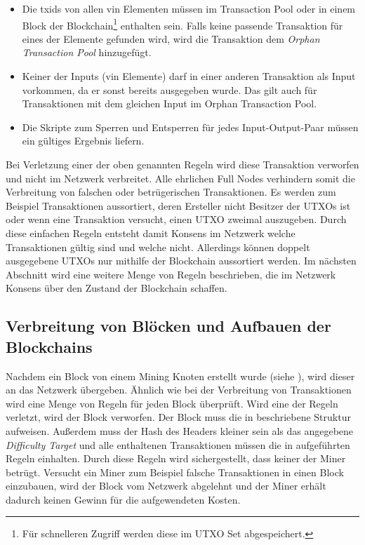 \documentclass[ngerman,runningheads,a4paper]{llncs}[2018/03/10]
\begin{document}
\begin{itemize}

\item Die txids von allen vin Elementen müssen im Transaction Pool oder in einem Block der Blockchain\footnote{Für schnelleren Zugriff werden diese im UTXO Set abgespeichert.} enthalten sein. Falls keine passende Transaktion für eines der Elemente gefunden wird, wird die Transaktion dem \textit{Orphan Transaction Pool} hinzugefügt.

\item Keiner der Inputs (vin Elemente) darf in einer anderen Transaktion als Input vorkommen, da er sonst bereits ausgegeben wurde. Das gilt auch für Transaktionen mit dem gleichen Input im Orphan Transaction Pool.

\item Die Skripte zum Sperren und Entsperren für jedes Input-Output-Paar müssen ein gültiges Ergebnis liefern.

\end{itemize}

Bei Verletzung einer der oben genannten Regeln wird diese Transaktion verworfen und nicht im Netzwerk verbreitet. Alle ehrlichen Full Nodes verhindern somit die Verbreitung von falschen oder betrügerischen Transaktionen. Es werden zum Beispiel Transaktionen aussortiert, deren Ersteller nicht Besitzer der UTXOs ist oder wenn eine Transaktion versucht, einen UTXO zweimal auszugeben. Durch diese einfachen Regeln entsteht damit Konsens im Netzwerk welche Transaktionen gültig sind und welche nicht. Allerdings können doppelt ausgegebene UTXOs nur mithilfe der Blockchain aussortiert werden. Im nächsten Abschnitt wird eine weitere Menge von Regeln beschrieben, die im Netzwerk Konsens über den Zustand der Blockchain schaffen.

\subsection{Verbreitung von Blöcken und Aufbauen der Blockchains}\label{sec:blockverbreitung}

Nachdem ein Block von einem Mining Knoten erstellt wurde (siehe ), wird dieser an das Netzwerk übergeben. Ähnlich wie bei der Verbreitung von Transaktionen wird eine Menge von Regeln für jeden Block überprüft. Wird eine der Regeln verletzt, wird der Block verworfen. Der Block muss die in  beschriebene Struktur aufweisen. Außerdem muss der Hash des Headers kleiner sein als das angegebene \textit{Difficulty Target} und alle enthaltenen Transaktionen müssen die in  aufgeführten Regeln einhalten. Durch diese Regeln wird sichergestellt, dass keiner der Miner betrügt. Versucht ein Miner zum Beispiel falsche Transaktionen in einen Block einzubauen, wird der Block vom Netzwerk abgelehnt und der Miner erhält dadurch keinen Gewinn für die aufgewendeten Kosten.
\end{document}
